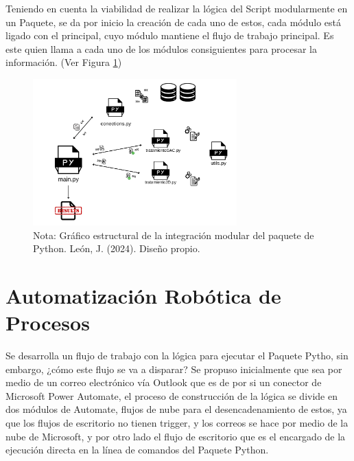 \documentclass[letter,oneside,12pt,spanish]{report}
\begin{document}
\noindent Teniendo en cuenta la viabilidad de realizar la lógica del Script modularmente en un Paquete, se da por inicio la creación de cada uno de estos, cada módulo está ligado con el principal, cuyo módulo mantiene el flujo de trabajo principal. Es este quien llama a cada uno de los módulos consiguientes para procesar la información. (Ver Figura \ref{fig:EstructurePacketPython})


\begin{figure}[ht]
    \centering
    \includegraphics[width=0.7\textwidth]{Figs/Estructura Paquete Python.png}
    \label{fig:EstructurePacketPython}
    \\Nota: Gráfico estructural de la integración modular del paquete de Python. León, J. (2024). Diseño propio.
\end{figure}

\section{Automatización Robótica de Procesos}

\noindent Se desarrolla un flujo de trabajo con la lógica para ejecutar el Paquete Pytho, sin embargo, ¿cómo este flujo se va a disparar? Se propuso inicialmente que sea por medio de un correo electrónico vía Outlook que es de por si un conector de Microsoft Power Automate, el proceso de construcción de la lógica se divide en dos módulos de Automate, flujos de nube para el desencadenamiento de estos, ya que los flujos de escritorio no tienen trigger, y los correos se hace por medio de la nube de Microsoft, y por otro lado el flujo de escritorio que es el encargado de la ejecución directa en la línea de comandos del Paquete Python.
\end{document}
